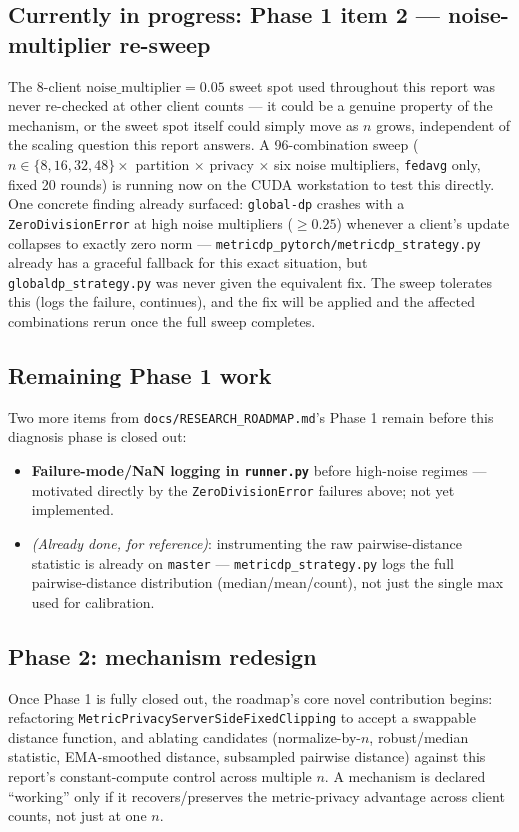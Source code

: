 \documentclass[11pt]{article}
\newcommand{\code}[1]{\texttt{#1}}
\begin{document}
\subsection{Currently in progress: Phase 1 item 2 --- noise-multiplier re-sweep}
The 8-client $\text{noise\_multiplier}=0.05$ sweet spot used throughout this report was never
re-checked at other client counts --- it could be a genuine property of the mechanism, or the sweet
spot itself could simply move as $n$ grows, independent of the scaling question this report
answers. A 96-combination sweep ($n \in \{8,16,32,48\} \times$ partition $\times$ privacy $\times$
six noise multipliers, \code{fedavg} only, fixed 20 rounds) is running now on the CUDA workstation
to test this directly. One concrete finding already surfaced: \code{global-dp} crashes with a
\code{ZeroDivisionError} at high noise multipliers ($\geq 0.25$) whenever a client's update collapses
to exactly zero norm --- \code{metricdp\_pytorch/metricdp\_strategy.py} already has a graceful
fallback for this exact situation, but \code{globaldp\_strategy.py} was never given the equivalent
fix. The sweep tolerates this (logs the failure, continues), and the fix will be applied and the
affected combinations rerun once the full sweep completes.

\subsection{Remaining Phase 1 work}
Two more items from \code{docs/RESEARCH\_ROADMAP.md}'s Phase 1 remain before this diagnosis phase
is closed out:
\begin{itemize}[leftmargin=1.4em]
    \item \textbf{Failure-mode/NaN logging in \code{runner.py}} before high-noise regimes ---
    motivated directly by the \code{ZeroDivisionError} failures above; not yet implemented.
    \item \emph{(Already done, for reference)}: instrumenting the raw pairwise-distance statistic
    is already on \code{master} --- \code{metricdp\_strategy.py} logs the full pairwise-distance
    distribution (median/mean/count), not just the single max used for calibration.
\end{itemize}

\subsection{Phase 2: mechanism redesign}
Once Phase 1 is fully closed out, the roadmap's core novel contribution begins: refactoring
\code{MetricPrivacyServerSideFixedClipping} to accept a swappable distance function, and ablating
candidates (normalize-by-$n$, robust/median statistic, EMA-smoothed distance, subsampled pairwise
distance) against this report's constant-compute control across multiple $n$. A mechanism is
declared ``working'' only if it recovers/preserves the metric-privacy advantage across client
counts, not just at one $n$.
\end{document}
